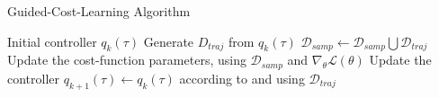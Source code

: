 \begin{algorithm}[htbp]
\caption{Guided-Cost-Learning Algorithm \cite{finn2016guided_cost_learning}}
\label{alg:guided_cost_learning}
\begin{algorithmic}
\REQUIRE Initial controller $q_{k}(\tau)$ 
    \STATE Generate $D_{traj}$ from $q_{k}(\tau)$
    \STATE $\mathcal{D}_{samp} \leftarrow \mathcal{D}_{samp} \bigcup \mathcal{D}_{traj}$
    \STATE Update the cost-function parameters, using $\mathcal{D}_{samp}$ and $\nabla_{\theta}\mathcal{L(\theta)}$
    \STATE Update the controller $q_{k+1}(\tau) \leftarrow q_{k}(\tau)$ according to \cite{levine2014lqr_flm} and using $\mathcal{D}_{traj}$
\ENDFOR
\end{algorithmic}
\end{algorithm}